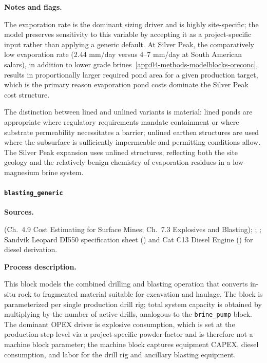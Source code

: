 \medskip
\noindent\textbf{Notes and flags.}\quad

The evaporation rate is the dominant sizing driver and is highly site-specific; the model preserves sensitivity to this variable by accepting it as a project-specific input rather than applying a generic default. At Silver Peak, the comparatively low evaporation rate (2.44 mm/day versus 4--7 mm/day at South American salars), in addition to lower grade brines~\ref{app:04-methods-modelblocks-oreconc}, results in proportionally larger required pond area for a given production target, which is the primary reason evaporation pond costs dominate the Silver Peak cost structure.
 
The distinction between lined and unlined variants is material: lined ponds are appropriate where regulatory requirements mandate containment or where substrate permeability necessitates a barrier; unlined earthen structures are used where the subsurface is sufficiently impermeable and permitting conditions allow. The Silver Peak expansion uses unlined structures, reflecting both the site geology and the relatively benign chemistry of evaporation residues in a low-magnesium brine system.

\clearpage
\paragraph{\texttt{blasting\_generic}}\label{app:04-methods-blockdefs-blastgeneric}

\medskip
\noindent\textbf{Sources.}\quad

\citet{darlingSMEMiningEngineering2011} (Ch.\ 4.9 Cost Estimating for Surface Mines; Ch.\ 7.3 Explosives and Blasting); \citet{warrenGeorgiaLakeLithium2022}; \citet{bbainc.SECTechnicalReport2023}; Sandvik Leopard DI550 specification sheet (\citet{sandvikSandvikLeopardDI5502022}) and Cat C13 Diesel Engine (\citet{caterpillarCatC13ACERT2016}) for diesel derivation. 

\medskip
\noindent\textbf{Process description.}\quad

This block models the combined drilling and blasting operation that converts in-situ rock to fragmented material suitable for excavation and haulage. The block is parameterized per single production drill rig; total system capacity is obtained by multiplying by the number of active drills, analogous to the \texttt{brine\_pump} block. The dominant OPEX driver is explosive consumption, which is set at the production step level via a project-specific powder factor and is therefore not a machine block parameter; the machine block captures equipment CAPEX, diesel consumption, and labor for the drill rig and ancillary blasting equipment.

